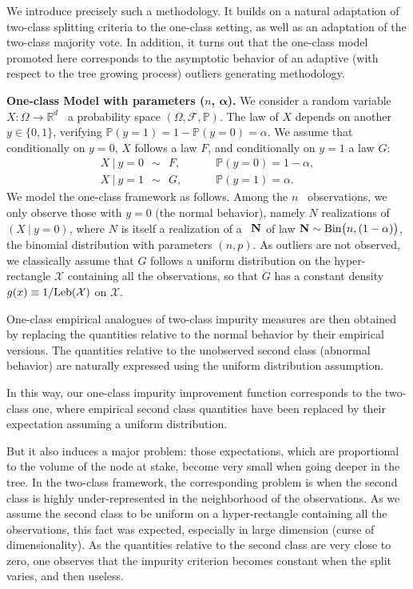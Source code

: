 We introduce precisely such a methodology. It builds on a natural adaptation of two-class %
splitting criteria to the one-class setting, as well as an adaptation of the two-class majority vote.
In addition, it turns out that the one-class model promoted here corresponds to the asymptotic behavior of an adaptive (with respect to the tree growing process) outliers generating methodology.

\textbf{One-class Model with parameters ($n$, $\boldsymbol{\alpha}$).}
We consider a random variable $ X:\Omega \to \mathbb{R}^d$ \wrt~a probability space $(\Omega, \mathcal{F}, \mathbb{P})$.
The law of $X$ depends on another \rv~$y \in \{0,1\}$, verifying $\mathbb{P}(y=1)=1-\mathbb{P}(y=0)=\alpha$. We assume that conditionally on $y=0$, $ X$ follows a law $F$, and conditionally on $y=1$ a law $G$:
\begin{align*}
 X ~|~ y=0 ~~\sim~~ F, &~~~~~~~~~~  \mathbb{P}(y=0)=1-\alpha, \\
 X ~|~ y=1 ~~\sim~~ G, &~~~~~~~~~~  \mathbb{P}(y=1)=\alpha.
\end{align*}
%
We model the one-class framework as follows. Among the $n$ \iid~observations, we only observe those with $y=0$ (the normal behavior), namely $N$ realizations of $( X ~|~ y=0)$, where $N$ is itself a realization of a \rv~$\mathbf N$ of law $\mathbf N \sim \text{Bin}\big(n, (1-\alpha)\big)$, the binomial distribution with parameters $(n, p)$. As outliers are not observed, we classically assume that $G$ follows a uniform distribution on the hyper-rectangle $\mathcal{X}$ containing all the observations, so that $G$ has a constant density $g(x) \equiv 1 / \text{Leb}(\mathcal{X})$ on $\mathcal{X}$. %

One-class empirical analogues of two-class impurity measures are then obtained by replacing the quantities relative to the normal behavior by their empirical versions.
The quantities relative to the unobserved second class (abnormal behavior) are naturally expressed using the uniform distribution assumption.

In this way, our one-class impurity improvement function corresponds to the two-class one, where empirical second class quantities have been replaced by their expectation assuming a uniform distribution.

But it also induces a major problem: those expectations, which are proportional to the volume of the node at stake, become very small when going deeper in the tree. In the two-class framework, the corresponding problem is when the second class is highly under-represented in the neighborhood of the observations. 
%
As we assume the second class to be uniform on a hyper-rectangle containing all the observations, this fact was expected, especially in large dimension (curse of dimensionality). 
%
As the quantities relative to the second class are very close to zero, one observes that the impurity criterion becomes constant when the split varies, and then useless.

